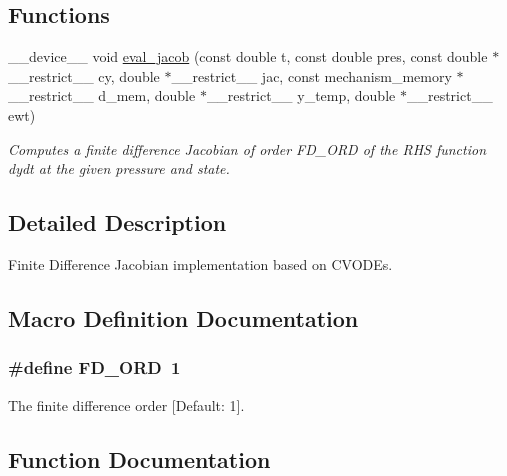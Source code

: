 \subsection*{Functions}
\begin{DoxyCompactItemize}
\item 
\+\_\+\+\_\+device\+\_\+\+\_\+ void \hyperlink{fd__jacob_8cu_ad1176739b8060ea7c37dc96b1b2d73c2}{eval\+\_\+jacob} (const double t, const double pres, const double $\ast$\+\_\+\+\_\+restrict\+\_\+\+\_\+ cy, double $\ast$\+\_\+\+\_\+restrict\+\_\+\+\_\+ jac, const mechanism\+\_\+memory $\ast$\+\_\+\+\_\+restrict\+\_\+\+\_\+ d\+\_\+mem, double $\ast$\+\_\+\+\_\+restrict\+\_\+\+\_\+ y\+\_\+temp, double $\ast$\+\_\+\+\_\+restrict\+\_\+\+\_\+ ewt)
\begin{DoxyCompactList}\small\item\em Computes a finite difference Jacobian of order F\+D\+\_\+\+O\+RD of the R\+HS function dydt at the given pressure and state. \end{DoxyCompactList}\end{DoxyCompactItemize}


\subsection{Detailed Description}
Finite Difference Jacobian implementation based on C\+V\+O\+D\+Es. 



\subsection{Macro Definition Documentation}
\subsubsection[{\texorpdfstring{F\+D\+\_\+\+O\+RD}{FD_ORD}}]{\setlength{\rightskip}{0pt plus 5cm}\#define F\+D\+\_\+\+O\+RD~1}\hypertarget{fd__jacob_8cu_a5c00ed5d35f84424a9e4b2197bf21ac7}{}\label{fd__jacob_8cu_a5c00ed5d35f84424a9e4b2197bf21ac7}


The finite difference order \mbox{[}Default\+: 1\mbox{]}. 



\subsection{Function Documentation}

